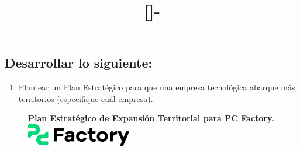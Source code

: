 \documentclass{templateNote}
\begin{document}

\title{[\asignatura]-\titulo}
\author{
    \autor
}
\portada
\margenes %

\subsection*{Desarrollar lo siguiente:}
\begin{enumerate}
    \item Plantear un Plan Estratégico para que una empresa tecnológica abarque más territorios (especifique cuál empresa). 
\end{enumerate} 

\begin{figure}[H]
    \centering
    \textbf{Plan Estratégico de Expansión Territorial para PC Factory.} \\
    \includegraphics[height=1cm]{img/PC_Factory_899_bef58adaa2.png}
\end{figure}
\end{document}
